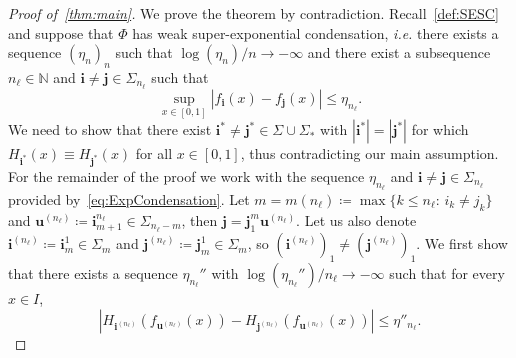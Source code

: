 \documentclass[11pt,]{article}
\def\cref#1{\ref{#1}}%
\theoremstyle{definition}
\theoremstyle{remark}
\renewcommand{\Bbb}[1]{\mathbb{#1}}
\newcommand{\bbN}{{\Bbb N}}         %
\newcommand{\0}{\mathbf{0}}
\newcommand{\bi}{\mathbf{i}}
\newcommand{\bj}{\mathbf{j}}
\newcommand{\bu}{\mathbf{u}}
\numberwithin{equation}{section}
\begin{document}
\begin{proof}[Proof of~\cref{thm:main}]
We prove the theorem by contradiction. Recall~\cref{def:SESC} and suppose that $\Phi$ has
weak super-exponential condensation, \emph{i.e.} there exists a sequence $(\eta_n)_n$ such that
$\log(\eta_n)/n\to-\infty$ and there exist a subsequence $n_{\ell}\in\bbN$ and
$\bi\neq\bj\in\Sigma_{n_\ell}$ such that
\begin{equation}\label{eq:ExpCondensation}
  \sup_{x\in[0,1]}|f_{\bi}(x)-f_{\bj}(x)| \leq \eta_{n_\ell}.
\end{equation}
We need to show that there exist $\bi^*\neq\bj^*\in\Sigma\cup\Sigma_*$ with $|\bi^*|=|\bj^*|$ for
which $H_{\bi^*}(x)\equiv
H_{\bj^*}(x)$ for all $x\in[0,1]$, thus contradicting our main assumption. For the remainder of the proof
we work with the sequence $\eta_{n_{\ell}}$ and $\bi\neq\bj\in\Sigma_{n_\ell}$ provided
by~\cref{eq:ExpCondensation}. Let $m=m(n_{\ell})\coloneqq\max\{k\leq n_{\ell}:\, i_k\neq j_k\}$ and
$\bu^{(n_{\ell})}\coloneqq \bi_{m+1}^{n_{\ell}}\in\Sigma_{n_\ell-m}$, then
$\bj=\bj_1^m\bu^{(n_{\ell})}$. Let us also denote $\bi^{(n_{\ell})}\coloneqq\bi_m^1\in\Sigma_m$ and
$\bj^{(n_{\ell})}\coloneqq\bj_m^1\in\Sigma_m$, so $(\bi^{(n_{\ell})})_1\neq (\bj^{(n_{\ell})})_1$.
We first show that there exists a sequence $\eta_{n_{\ell}}''$ with
$\log(\eta_{n_{\ell}}'')/n_{\ell}\to-\infty$ such that for every $x\in I$,
\begin{equation}\label{eq:DiffH_iSUperExp}
|H_{\bi^{(n_\ell)}}(f_{\bu^{(n_\ell)}}(x)) - H_{\bj^{(n_\ell)}}(f_{\bu^{(n_\ell)}}(x))| \leq \eta''_{n_\ell}.
\end{equation}


\end{proof}
\end{document}
